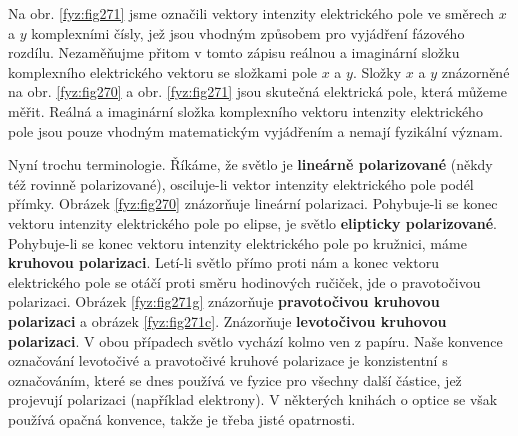     Na obr. \ref{fyz:fig271} jsme označili vektory intenzity elektrického pole ve směrech \(x\) a
    \(y\) komplexními čísly, jež jsou vhodným způsobem pro vyjádření fázového rozdílu. Nezaměňujme
    přitom v tomto zápisu reálnou a imaginární složku komplexního elektrického vektoru se složkami
    pole \(x\) a \(y\). Složky \(x\) a \(y\) znázorněné na obr. \ref{fyz:fig270} a obr.
    \ref{fyz:fig271} jsou skutečná elektrická pole, která můžeme měřit. Reálná a imaginární složka
    komplexního vektoru intenzity elektrického pole jsou pouze vhodným matematickým vyjádřením a
    nemají fyzikální význam.

    Nyní trochu terminologie. Říkáme, že světlo je \textbf{lineárně polarizované} (někdy též rovinně
    polarizované), osciluje-li vektor intenzity elektrického pole podél přímky. Obrázek
    \ref{fyz:fig270} znázorňuje lineární polarizaci. Pohybuje-li se konec vektoru intenzity
    elektrického pole po elipse, je světlo \textbf{elipticky polarizované}. Pohybuje-li se konec
    vektoru intenzity elektrického pole po kružnici, máme \textbf{kruhovou polarizaci}. Letí-li
    světlo přímo proti nám a konec vektoru elektrického pole se otáčí proti směru hodinových
    ručiček, jde o pravotočivou polarizaci. Obrázek \ref{fyz:fig271g} znázorňuje
    \textbf{pravotočivou kruhovou polarizaci} a obrázek \ref{fyz:fig271c}. Znázorňuje
    \textbf{levotočivou kruhovou polarizaci}. V obou případech světlo vychází kolmo ven z papíru.
    Naše konvence označování levotočivé a pravotočivé kruhové polarizace je konzistentní s
    označováním, které se dnes používá ve fyzice pro všechny další částice, jež projevují polarizaci
    (například elektrony). V některých knihách o optice se však používá opačná konvence, takže je
    třeba jisté opatrnosti.

